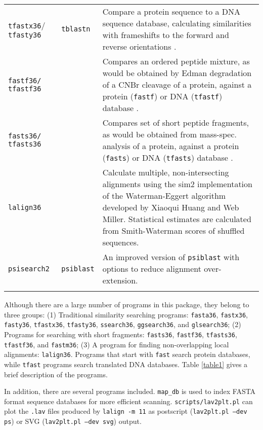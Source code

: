 \documentclass[11pt]{article}
\begin{document}
\begin{table}
\begin{tabular}{ p{0.8in} p{0.6in} p{4.6 in}}
\texttt{tfastx36}/ \texttt{tfasty36}& \texttt{tblastn} &
Compare a protein sequence to a DNA sequence
database, calculating similarities with frameshifts to the forward and
reverse orientations  \cite{wrp971}.\\[1 ex]

\texttt{fastf36/ tfastf36} &  &
Compares an ordered peptide mixture, as would be obtained by
Edman degradation of a CNBr cleavage of a protein, against a protein
(\texttt{fastf}) or DNA (\texttt{tfastf}) database \cite{wrp021}.\\[1 ex]

\texttt{fasts36/ tfasts36} &  &
Compares set of short peptide fragments, as would be obtained
from mass-spec. analysis of a protein, against a
protein (\texttt{fasts}) or DNA (\texttt{tfasts}) database \cite{wrp021}.\\[1 ex]

\texttt{lalign36} & & Calculate multiple, non-intersecting alignments
using the sim2 implementation of the Waterman-Eggert
algorithm\cite{wat875} developed by Xiaoqui Huang and Web
Miller\cite{mil908}.  Statistical estimates are calculated from
Smith-Waterman scores of shuffled sequences. \\[1 ex]

\texttt{psisearch2} & \texttt{psiblast} & An improved version of \texttt{psiblast} with options to reduce alignment over-extension.\cite{wrp103,wrp171}\\[1 ex]

\hline \\
\end{tabular}
\end{table}

Although there are a large number of programs in this package, they
belong to three groups: (1) Traditional similarity searching programs:
\texttt{fasta36}, \texttt{fastx36}, \texttt{fasty36},
\texttt{tfastx36}, \texttt{tfasty36}, \texttt{ssearch36},
\texttt{ggsearch36}, and \texttt{glsearch36}; (2) Programs for
searching with short fragments: \texttt{fasts36}, \texttt{fastf36},
\texttt{tfasts36}, \texttt{tfastf36}, and \texttt{fastm36}; (3) A
program for finding non-overlapping local alignments: \texttt{lalign36}.
Programs that start with \texttt{fast} search protein databases, while
\texttt{tfast} programs search translated DNA databases.  Table \ref{table1}
gives a brief description of the programs.

In addition, there are several programs included. \texttt{map\_db} is
used to index FASTA format sequence databases for more efficient
scanning. \texttt{scripts/lav2plt.pl} can plot the \texttt{.lav}
files produced by \texttt{lalign -m 11} as postscript
(\texttt{lav2plt.pl --dev ps}) or SVG (\texttt{lav2plt.pl --dev svg}) output.
\end{document}

